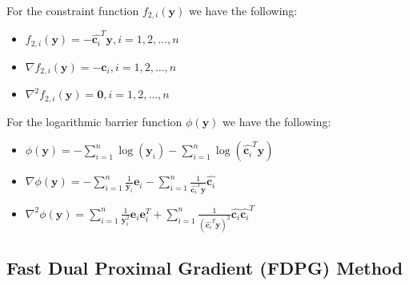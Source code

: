 \documentclass{beamer}
\begin{document}
\begin{frame}

\justifying
For the constraint function $f_{2,i}\left(\mathbf{y}\right)$ we have the following:
\begin{itemize}
	\item $f_{2,i}\left(\mathbf{y}\right) = -\hat{\mathbf{c}_{i}}^{T}\mathbf{y}, i=1,2,\dots,n$
	\item $\nabla f_{2,i}\left(\mathbf{y}\right) = -\hat{\mathbf{c}_{i}}, i=1,2,\dots,n$
	\item $\nabla^{2}f_{2,i}\left(\mathbf{y}\right) = \mathbf{0}, i=1,2,\dots,n$
\end{itemize}

\vspace{0.8cm}
\justifying
For the logarithmic barrier function $\phi\left(\mathbf{y}\right)$ we have the following:
\begin{itemize}
	\item $\phi\left(\mathbf{y}\right) = - \sum_{i=1}^{n} \log\left(\mathbf{y}_{i}\right) - \sum_{i=1}^{n} \log\left(\hat{\mathbf{c}_{i}}^{T}\mathbf{y}\right) $
	\item $\nabla \phi\left(\mathbf{y}\right) = - \sum_{i=1}^{n} \frac{1}{\mathbf{y}_{i}}\mathbf{e}_{i} - \sum_{i=1}^{n} \frac{1}{\hat{\mathbf{c}_{i}}^{T}\mathbf{y}} \hat{\mathbf{c}_{i}}$
	\item $\nabla^{2}\phi\left(\mathbf{y}\right) = \sum_{i=1}^{n} \frac{1}{\mathbf{y}_{i}^{2}}\mathbf{e}_{i} \mathbf{e}_{i}^{T} + \sum_{i=1}^{n} \frac{1}{\left(\hat{\mathbf{c}_{i}}^{T}\mathbf{y}\right)^{2}} \hat{\mathbf{c}_{i}} \hat{\mathbf{c}_{i}}^{T}$
\end{itemize}

\end{frame}






\subsection{Fast Dual Proximal Gradient (FDPG) Method}
\end{document}
